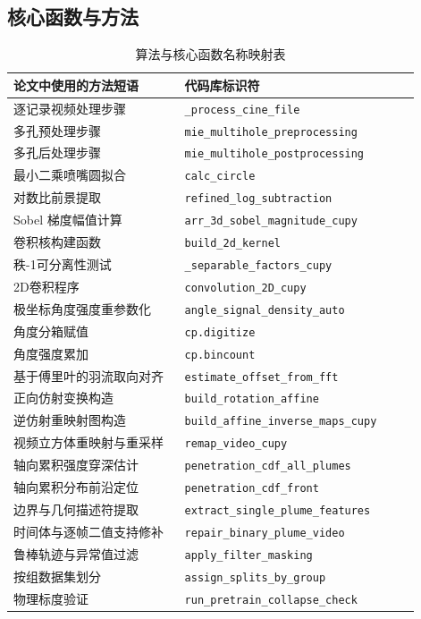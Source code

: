 \FloatBarrier
\clearpage

\subsection{核心函数与方法}

\begin{table}[h]
\centering
\footnotesize
\begin{tabular}{p{0.4\linewidth} p{0.55\linewidth}}
\toprule
\textbf{论文中使用的方法短语} & \textbf{代码库标识符} \\
\midrule
逐记录视频处理步骤 & \texttt{\_process\_cine\_file} \\
多孔预处理步骤 & \texttt{mie\_multihole\_preprocessing} \\
多孔后处理步骤 & \texttt{mie\_multihole\_postprocessing} \\
最小二乘喷嘴圆拟合 & \texttt{calc\_circle} \\
对数比前景提取 & \texttt{refined\_log\_subtraction} \\
Sobel 梯度幅值计算 & \texttt{arr\_3d\_sobel\_magnitude\_cupy} \\
卷积核构建函数 & \texttt{build\_2d\_kernel} \\
秩-1可分离性测试 & \texttt{\_separable\_factors\_cupy} \\
2D卷积程序 & \texttt{convolution\_2D\_cupy} \\
极坐标角度强度重参数化 & \texttt{angle\_signal\_density\_auto} \\
角度分箱赋值 & \texttt{cp.digitize} \\
角度强度累加 & \texttt{cp.bincount} \\
基于傅里叶的羽流取向对齐 & \texttt{estimate\_offset\_from\_fft} \\
正向仿射变换构造 & \texttt{build\_rotation\_affine} \\
逆仿射重映射图构造 & \texttt{build\_affine\_inverse\_maps\_cupy} \\
视频立方体重映射与重采样 & \texttt{remap\_video\_cupy} \\
轴向累积强度穿深估计 & \texttt{penetration\_cdf\_all\_plumes} \\
轴向累积分布前沿定位 & \texttt{penetration\_cdf\_front} \\
边界与几何描述符提取 & \texttt{extract\_single\_plume\_features} \\
时间体与逐帧二值支持修补 & \texttt{repair\_binary\_plume\_video} \\
鲁棒轨迹与异常值过滤 & \texttt{apply\_filter\_masking} \\
按组数据集划分 & \texttt{assign\_splits\_by\_group} \\
物理标度验证 & \texttt{run\_pretrain\_collapse\_check} \\
\bottomrule
\end{tabular}
\caption{算法与核心函数名称映射表}
\end{table}
\FloatBarrier
\clearpage

